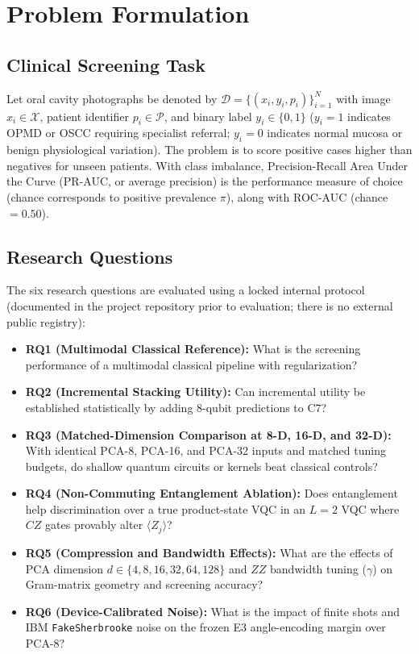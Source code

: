 \documentclass[conference]{IEEEtran}
\begin{document}
\section{Problem Formulation}

\subsection{Clinical Screening Task}
Let oral cavity photographs be denoted by $\mathcal{D} = \{(x_i, y_i, p_i)\}_{i=1}^{N}$ with image $x_i \in \mathcal{X}$, patient identifier $p_i \in \mathcal{P}$, and binary label $y_i \in \{0, 1\}$ ($y_i = 1$ indicates OPMD or OSCC requiring specialist referral; $y_i = 0$ indicates normal mucosa or benign physiological variation). The problem is to score positive cases higher than negatives for unseen patients. With class imbalance, Precision-Recall Area Under the Curve (PR-AUC, or average precision) is the performance measure of choice~\cite{saito2015precision} (chance corresponds to positive prevalence $\pi$), along with ROC-AUC (chance $= 0.50$).

\subsection{Research Questions}
The six research questions are evaluated using a locked internal protocol (documented in the project repository prior to evaluation; there is no external public registry):
\begin{itemize}
    \item \textbf{RQ1 (Multimodal Classical Reference):} What is the screening performance of a multimodal classical pipeline with regularization?
    \item \textbf{RQ2 (Incremental Stacking Utility):} Can incremental utility be established statistically by adding 8-qubit predictions to C7?
    \item \textbf{RQ3 (Matched-Dimension Comparison at 8-D, 16-D, and 32-D):} With identical PCA-8, PCA-16, and PCA-32 inputs and matched tuning budgets, do shallow quantum circuits or kernels beat classical controls?
    \item \textbf{RQ4 (Non-Commuting Entanglement Ablation):} Does entanglement help discrimination over a true product-state VQC in an $L=2$ VQC where $CZ$ gates provably alter $\langle Z_j \rangle$?
    \item \textbf{RQ5 (Compression and Bandwidth Effects):} What are the effects of PCA dimension $d \in \{4, 8, 16, 32, 64, 128\}$ and $ZZ$ bandwidth tuning ($\gamma$) on Gram-matrix geometry and screening accuracy?
    \item \textbf{RQ6 (Device-Calibrated Noise):} What is the impact of finite shots and IBM \texttt{FakeSherbrooke} noise on the frozen E3 angle-encoding margin over PCA-8?
\end{itemize}
\end{document}
